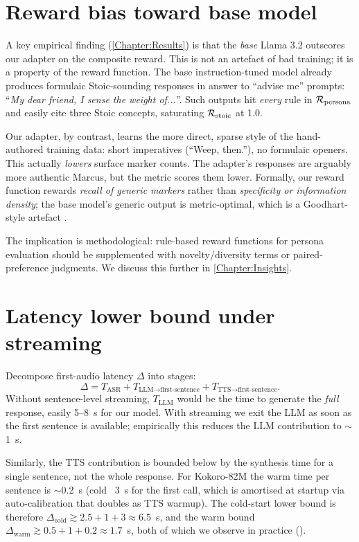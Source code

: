 \documentclass{ecsproject}
\begin{document}
\section{Reward bias toward base model}
A key empirical finding (\cref{Chapter:Results}) is that the
\emph{base} Llama 3.2 outscores our adapter on the composite reward.
This is not an artefact of bad training; it is a property of the
reward function. The base instruction-tuned model already produces
formulaic Stoic-sounding responses in answer to ``advise me'' prompts:
``\emph{My dear friend, I sense the weight of...}''. Such outputs hit
\emph{every} rule in $\mathcal{R}_{\text{persona}}$ and easily cite three
Stoic concepts, saturating $\mathcal{R}_{\text{stoic}}$ at 1.0.

Our adapter, by contrast, learns the more direct, sparse style of the
hand-authored training data: short imperatives (``Weep, then.''),
no formulaic openers. This actually \emph{lowers} surface marker counts.
The adapter's responses are arguably more authentic Marcus, but the
metric scores them lower. Formally, our reward function rewards
\emph{recall of generic markers} rather than \emph{specificity or
information density}; the base model's generic output is metric-optimal,
which is a Goodhart-style artefact \citep{ouyang2022instruct}.

The implication is methodological: rule-based reward functions for
persona evaluation should be supplemented with novelty/diversity terms
or paired-preference judgments. We discuss this further in
\cref{Chapter:Insights}.

\section{Latency lower bound under streaming}
Decompose first-audio latency $\Delta$ into stages:
\begin{equation}
\Delta = T_{\text{ASR}} + T_{\text{LLM}\to\text{first-sentence}}
       + T_{\text{TTS}\to\text{first-sentence}}.
\end{equation}
Without sentence-level streaming, $T_{\text{LLM}}$ would be the time
to generate the \emph{full} response, easily 5--8~s for our model. With
streaming we exit the LLM as soon as the first sentence is available;
empirically this reduces the LLM contribution to $\sim$1~s.

Similarly, the TTS contribution is bounded below by the synthesis time
for a single sentence, not the whole response. For Kokoro-82M the
warm time per sentence is $\sim$0.2~s (cold ~3~s for the first call,
which is amortised at startup via auto-calibration that doubles as
TTS warmup). The cold-start lower bound is therefore
$\Delta_{\text{cold}} \gtrsim 2.5 + 1 + 3 \approx 6.5$~s, and the
warm bound $\Delta_{\text{warm}} \gtrsim 0.5 + 1 + 0.2 \approx 1.7$~s,
both of which we observe in practice ().
\end{document}
